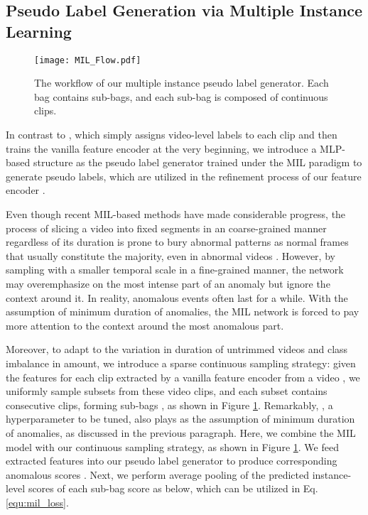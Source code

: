 \documentclass[final]{cvpr}
\newcommand{\ftnd}{\textcolor[rgb]{0.,0,0}}
\newcommand{\jcnd}{\textcolor[rgb]{0,0.,0}}
\newcommand{\jcca}{\textcolor[rgb]{0,0,0}}
\begin{document}
\subsection{Pseudo Label Generation via Multiple Instance Learning} \label{sec:mil}
\vspace{-0.1cm}
\begin{figure}[t]
    \centering
    \texttt{[image: MIL\_Flow.pdf]}
    \vspace{-0.1cm}
    \caption{\ftnd{The workflow of our multiple instance pseudo label generator}. Each bag contains  sub-bags, and each sub-bag is composed of  continuous clips. }
    \label{fig:MIL_Flow}
    \vspace{-0.4cm}
\end{figure}
In contrast to \cite{zhong2019graph}, which simply assigns video-level labels to each clip and then trains the vanilla feature encoder at the very beginning, we introduce a \jcca{MLP-based} structure as the pseudo label generator \jcca{trained under the MIL paradigm} to generate pseudo labels, which are utilized in the refinement process of our feature encoder .

Even though recent MIL-based methods \cite{sultani2018real,zhang2019temporal} have made considerable progress, the process of slicing a video into fixed segments \jcca{in an coarse-grained manner} regardless of its duration is prone to bury abnormal patterns as normal frames that usually constitute the majority, even in abnormal videos \cite{wan2020weakly}. 
\jcnd{However, by sampling with a smaller temporal scale \jcca{in a fine-grained manner}, the network may overemphasize on the most intense part of an anomaly but ignore the context around it. }In reality, anomalous events often last for a while. With the assumption of minimum duration of anomalies, 
\jcnd{the MIL network is forced to pay more attention to the context around the most anomalous part.}

\jcnd{Moreover, to} adapt to the variation in duration of untrimmed videos and class imbalance \jcnd{in amount}, we introduce a sparse continuous sampling strategy: given the features for each clip extracted by a vanilla feature encoder  from a video , we uniformly sample  subsets from these video clips, and each subset contains  consecutive clips, forming  sub-bags , as shown in Figure \ref{fig:MIL_Flow}. 
\jcca{Remarkably, , a hyperparameter to be tuned, also plays as the assumption of minimum duration of anomalies, as discussed in the previous paragraph.}
Here, we combine the MIL model 
with our continuous sampling strategy, as shown in Figure \ref{fig:MIL_Flow}. We feed extracted features into our pseudo label generator to produce corresponding anomalous scores . Next, we perform average pooling of the predicted instance-level scores  of each sub-bag score as  below, which can be utilized in Eq. \ref{equ:mil_loss}.
\end{document}
